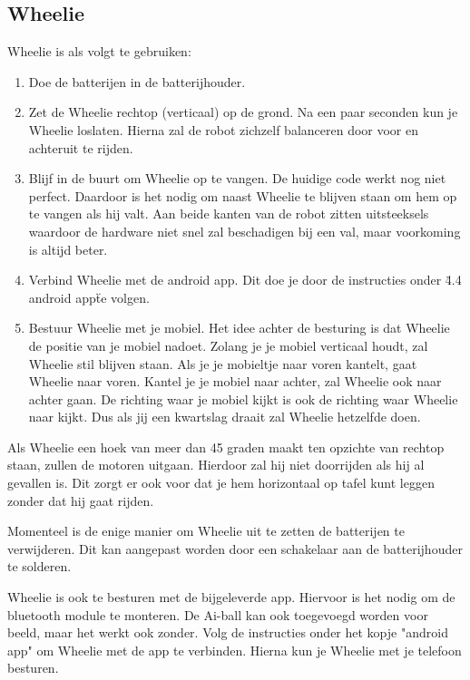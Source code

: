 \documentclass[12pt,a4paper]{article}
\begin{document}
\subsection{Wheelie}
Wheelie is als volgt te gebruiken:
	
\begin{enumerate}
	\item Doe de batterijen in de batterijhouder.
	\item Zet de Wheelie rechtop (verticaal) op de grond. 
	Na een paar seconden kun je Wheelie loslaten. Hierna zal de robot zichzelf balanceren door voor en achteruit te rijden. 
	\item Blijf in de buurt om Wheelie op te vangen.
	De huidige code werkt nog niet perfect. Daardoor is het nodig om naast Wheelie te blijven staan om hem op te vangen als hij valt. Aan beide kanten van de robot zitten uitsteeksels waardoor de hardware niet snel zal beschadigen bij een val, maar voorkoming is altijd beter. 
	\item Verbind Wheelie met de android app. 
	Dit doe je door de instructies onder \"4.4 android app\" te volgen.
	\item Bestuur Wheelie met je mobiel.
	Het idee achter de besturing is dat Wheelie de positie van je mobiel nadoet. Zolang je je mobiel verticaal houdt, zal Wheelie stil blijven staan. Als je je mobieltje naar voren kantelt, gaat Wheelie naar voren. Kantel je je mobiel naar achter, zal Wheelie ook naar achter gaan. De richting waar je mobiel kijkt is ook de richting waar Wheelie naar kijkt. Dus als jij een kwartslag draait zal Wheelie hetzelfde doen.
\end{enumerate}

Als Wheelie een hoek van meer dan 45 graden maakt ten opzichte van rechtop staan, zullen de motoren uitgaan. Hierdoor zal hij niet doorrijden als hij al gevallen is. Dit zorgt er ook voor dat je hem horizontaal op tafel kunt leggen zonder dat hij gaat rijden. 

Momenteel is de enige manier om Wheelie uit te zetten de batterijen te verwijderen. Dit kan aangepast worden door een schakelaar aan de batterijhouder te solderen.

Wheelie is ook te besturen met de bijgeleverde app. Hiervoor is het nodig om de bluetooth module te monteren. De Ai-ball kan ook toegevoegd worden voor beeld, maar het werkt ook zonder. Volg de instructies onder het kopje "android app" om Wheelie met de app te verbinden. Hierna kun je Wheelie met je telefoon besturen. 
\end{document}
